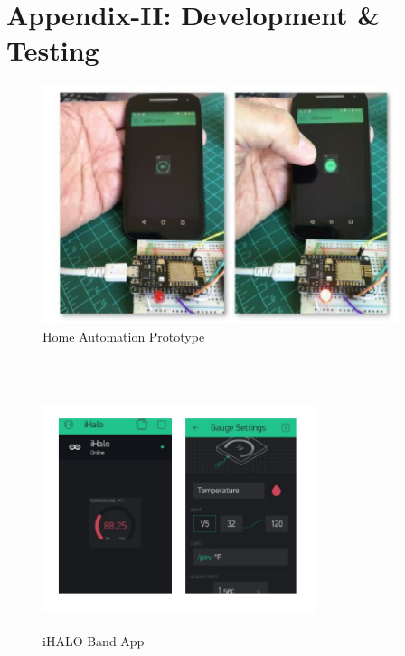 \section{Appendix-II: Development \& Testing}
\begin{figure}[H]
	
	\centering
	\includegraphics[width=\linewidth,height=7cm] {./images/p10.png}
	\caption{Home Automation Prototype}
	\label{manual}
\end{figure}\\

\begin{figure}[H]
	
	\centering
	\includegraphics[width=8cm,height=7cm] {./images/p11.png}
	\caption{iHALO Band App}
	\label{manual}
\end{figure}\\

